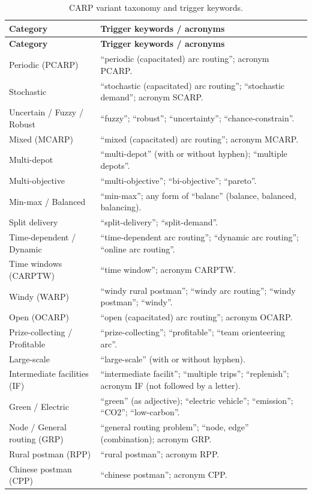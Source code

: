 \documentclass[11pt]{article}
\begin{document}
{\small
\begin{longtable}{@{}p{4.3cm}p{9.3cm}@{}}
\caption{CARP variant taxonomy and trigger keywords.}\label{tab:variants}\\
\toprule
\textbf{Category} & \textbf{Trigger keywords / acronyms} \\
\midrule
\endfirsthead
\toprule
\textbf{Category} & \textbf{Trigger keywords / acronyms} \\
\midrule
\endhead
Periodic (PCARP) &
  ``periodic (capacitated) arc routing''; acronym PCARP. \\
Stochastic &
  ``stochastic (capacitated) arc routing''; ``stochastic demand''; acronym SCARP. \\
Uncertain / Fuzzy / Robust &
  ``fuzzy''; ``robust''; ``uncertainty''; ``chance-constrain''. \\
Mixed (MCARP) &
  ``mixed (capacitated) arc routing''; acronym MCARP. \\
Multi-depot &
  ``multi-depot'' (with or without hyphen); ``multiple depots''. \\
Multi-objective &
  ``multi-objective''; ``bi-objective''; ``pareto''. \\
Min-max / Balanced &
  ``min-max''; any form of ``balanc'' (balance, balanced, balancing). \\
Split delivery &
  ``split-delivery''; ``split-demand''. \\
Time-dependent / Dynamic &
  ``time-dependent arc routing''; ``dynamic arc routing''; ``online arc routing''. \\
Time windows (CARPTW) &
  ``time window''; acronym CARPTW. \\
Windy (WARP) &
  ``windy rural postman''; ``windy arc routing''; ``windy postman''; ``windy''. \\
Open (OCARP) &
  ``open (capacitated) arc routing''; acronym OCARP. \\
Prize-collecting / Profitable &
  ``prize-collecting''; ``profitable''; ``team orienteering arc''. \\
Large-scale &
  ``large-scale'' (with or without hyphen). \\
Intermediate facilities (IF) &
  ``intermediate facilit''; ``multiple trips''; ``replenish''; acronym IF (not
  followed by a letter). \\
Green / Electric &
  ``green'' (as adjective); ``electric vehicle''; ``emission''; ``CO2'';
  ``low-carbon''. \\
Node / General routing (GRP) &
  ``general routing problem''; ``node, edge'' (combination); acronym GRP. \\
Rural postman (RPP) &
  ``rural postman''; acronym RPP. \\
Chinese postman (CPP) &
  ``chinese postman''; acronym CPP. \\
\bottomrule
\end{longtable}
}
\end{document}
